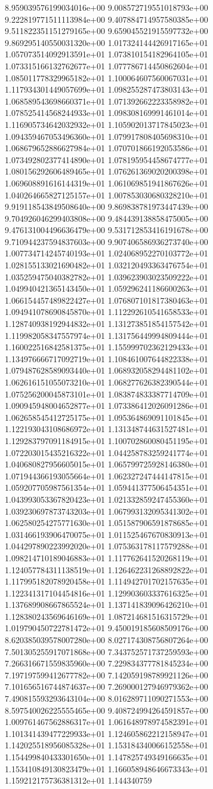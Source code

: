 8.959039576199034016e+00	9.008572719551018793e+00	9.222819771511113984e+00	9.407884714957580385e+00	9.511822351151279165e+00	9.659045521915597732e+00	9.869295140550031320e+00	1.017324144426917165e+01	1.057073514092913591e+01	1.073810154182964105e+01	1.073315166132762677e+01	1.077786714450862604e+01	1.085011778329965182e+01	1.100064607560067031e+01	1.117934301449057699e+01	1.098255287473803143e+01	1.068589543698660371e+01	1.071392662223358982e+01	1.078525414568244933e+01	1.098308169991461014e+01	1.116905734642032932e+01	1.105902013717845023e+01	1.094359467053496360e+01	1.079917808405698310e+01	1.068679652886627984e+01	1.070701866192053586e+01	1.073492802377414890e+01	1.078195954458674777e+01	1.080156292606489465e+01	1.076261369020200398e+01	1.069608891616144319e+01	1.061069851941867626e+01	1.040264665827125157e+01	1.007853030680328210e+01	9.919118543849508640e+00	9.869838781973447439e+00	9.704926046299403808e+00	9.484439138858475005e+00	9.476131004496636479e+00	9.531712853416191678e+00	9.710944237594837603e+00	9.907406586936273740e+00	1.007734714245740193e+01	1.024068952270103772e+01	1.028155133021690482e+01	1.032120493363476754e+01	1.035259475040382782e+01	1.039623903023509222e+01	1.049940421365143450e+01	1.059296241186600263e+01	1.066154457489822427e+01	1.076807101817380463e+01	1.094941078690845870e+01	1.112292610541658533e+01	1.128740938192944832e+01	1.131273851854157542e+01	1.119982058347557974e+01	1.131756449994809444e+01	1.160022516842581375e+01	1.155999702362129433e+01	1.134976666717092719e+01	1.108461007644822338e+01	1.079487628589093440e+01	1.068932058294481102e+01	1.062616151055073210e+01	1.068277626382390544e+01	1.075256200045873101e+01	1.083874833387714709e+01	1.090945948004652877e+01	1.073386412026091286e+01	1.062658545412725175e+01	1.095364869091101845e+01	1.122193043108686972e+01	1.131348744631527481e+01	1.129283797091184915e+01	1.100702860080451195e+01	1.072203015435216322e+01	1.044258783259241774e+01	1.040680827956605015e+01	1.065799725928146380e+01	1.071944366193055664e+01	1.062327247444147815e+01	1.059207705987561354e+01	1.059441377506454351e+01	1.043993053367820423e+01	1.021332859247455360e+01	1.039230697873743203e+01	1.067993132095341302e+01	1.062580254275771630e+01	1.051587906591878685e+01	1.031466193906470075e+01	1.011525467670830913e+01	1.044297890223992020e+01	1.075363178117579288e+01	1.098214710189046883e+01	1.117762641520268119e+01	1.124057784311138519e+01	1.126462231268892822e+01	1.117995182078920458e+01	1.114942701702157635e+01	1.122341317104454816e+01	1.129903603337616325e+01	1.137689908667865524e+01	1.137141839096426210e+01	1.128380243569646169e+01	1.087214681516315729e+01	1.019790450722781472e+01	9.450019185608509176e+00	8.620385039578007280e+00	8.027174308756807264e+00	7.501305255917071868e+00	7.343752571737259593e+00	7.266316671559835960e+00	7.229834377781845234e+00	7.197197599412677782e+00	7.142059198789921126e+00	7.101656516744874637e+00	7.269000127946979362e+00	7.490815593293643104e+00	8.016289711090271553e+00	8.597540026225555465e+00	9.408724994264591857e+00	1.009761467562886317e+01	1.061648978974582391e+01	1.101341439477229933e+01	1.124605862212158947e+01	1.142025518956085328e+01	1.153184340066152558e+01	1.154499840433301650e+01	1.147825749349166635e+01	1.153410849130823479e+01	1.166058948646673343e+01	1.159212175736381312e+01	1.144340759